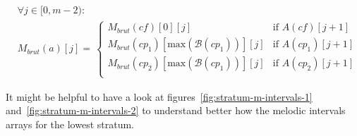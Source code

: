 \begin{equation}
    \begin{aligned}
        &\forall j \in [0, m-2):\\
        &M_{brut}(a)[j] = \,  
        \begin{cases}
            M_{brut}(cf)[0][j] & \text{if } A(cf)[j+1]\\
            M_{brut}(cp_1)[\text{max}(\mathcal{B}(cp_1))][j] & \text{if } A(cp_1)[j+1]\\
            M_{brut}(cp_2)[\text{max}(\mathcal{B}(cp_1))][j] & \text{if } A(cp_2)[j+1]\\
        \end{cases}
    \end{aligned}
\end{equation}

\noindent It might be helpful to have a look at figures~\ref{fig:stratum-m-intervals-1} and~\ref{fig:stratum-m-intervals-2} to understand better how the melodic intervals arrays for the lowest stratum.

